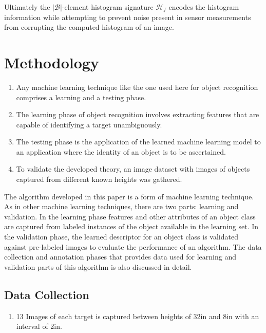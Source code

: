 \documentclass {udthesis}
\begin{document}
Ultimately the $|\mathcal{B}|$-element histogram signature $\mathcal{H}_f$ encodes the histogram information while attempting to prevent noise present in sensor measurements from corrupting the computed histogram of an image.

\section{Methodology}
\label{sec:distdes_methodology}

\begin{enumerate}
	\item Any machine learning technique like the one used here for object recognition comprises a learning and a testing phase.
	
	\item The learning phase of object recognition involves extracting features that are capable of identifying a target unambiguously.
	
	\item The testing phase is the application of the learned machine learning model to an application where the identity of an object is to be ascertained.
	
	\item To validate the developed theory, an image dataset with images of objects captured from different known heights was gathered.
\end{enumerate}	


The algorithm developed in this paper is a form of machine learning technique. As in other machine learning techniques, there are two parts: learning and validation. In the learning phase features and other attributes of an object class are captured from labeled instances of the object available in the learning set. In the validation phase, the learned descriptor for an object class is validated against pre-labeled images to evaluate the performance of an algorithm. The data collection and annotation phases that provides data used for learning and validation parts of this algorithm is also discussed in detail.

\subsection{Data Collection}
\label{sec:distdes_data_collection}

\begin{enumerate}
  \item 13 Images of each target is captured between heights of 32in and 8in with an interval of 2in.
\end{enumerate}	
\end{document}
